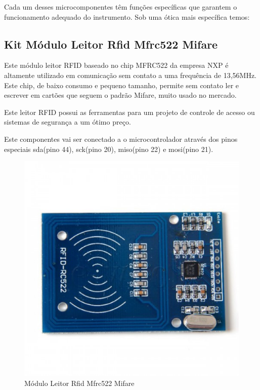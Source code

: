 Cada um desses microcomponentes têm funções específicas que garantem o funcionamento adequado do instrumento. Sob uma ótica mais específica temos:

\subsection{Kit Módulo Leitor Rfid Mfrc522 Mifare}


Este módulo leitor RFID baseado no chip MFRC522 da empresa NXP é altamente utilizado em comunicação sem contato a uma frequência de 13,56MHz. Este chip, de baixo consumo e pequeno tamanho, permite sem contato ler e escrever em cartões que seguem o padrão Mifare, muito usado no mercado.

Este leitor RFID possui as ferramentas para um projeto de controle de acesso ou sistemas de segurança a um ótimo preço.

Este componentes vai ser conectado a o microcontrolador através dos pinos especiais sda(pino 44), sck(pino 20), miso(pino 22) e mosi(pino 21).

\begin{figure}[!ht]
  \centering
  \includegraphics[keepaspectratio=true,scale=0.5]{figuras/rfid.eps}
  \caption{Módulo Leitor Rfid Mfrc522 Mifare}
\end{figure}


